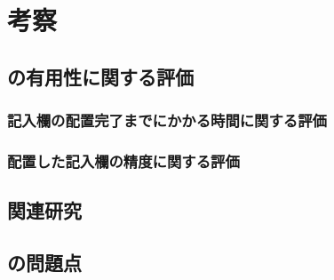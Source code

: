 \chapter{考察}\label{cha:Discussion}



\section{\toolName の有用性に関する評価}\label{sec:evalue_usefulness}

\subsection{記入欄の配置完了までにかかる時間に関する評価}\label{subsec:evalue_required_time}

\subsection{配置した記入欄の精度に関する評価}\label{subsec:evalue_accuracy}



\section{関連研究}\label{sec:relation_research}



\section{\toolName の問題点}\label{sec:AWSEL_problems}